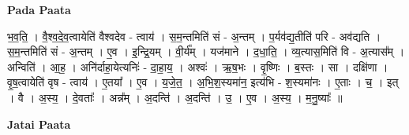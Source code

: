 \documentclass[17pt]{extarticle}
\begin{document}
\textbf{Pada Paata} \newline

भ॒व॒ति॒ । वै॒श्व॒दे॒व॒त्वायेति॑ वैश्वदेव - त्वाय॑ । स॒म॒न्तमिति॑ सं - अ॒न्तम् । प॒र्यव॑द्य॒तीति॑ परि - अव॑द्यति । स॒म॒न्तमिति॑ सं - अ॒न्तम् । ए॒व ।  इ॒न्द्रि॒यम् । वी॒र्य᳚म् । यज॑माने । द॒धा॒ति॒ । व्य॒त्यास॒मिति॑ वि - अ॒त्यास᳚म् । अन्विति॑ । आ॒ह॒ । अनि॑र्दाहा॒येत्यनिः॑ - दा॒हा॒य॒ । अश्वः॑ ।   ऋ॒ष॒भः । वृ॒ष्णिः । ब॒स्तः । सा । दक्षि॑णा । वृ॒ष॒त्वायेति॑ वृष - त्वाय॑ । ए॒तया᳚ । ए॒व । य॒जे॒त॒ । अ॒भि॒श॒स्यमा॑न॒ इत्य॑भि - श॒स्यमा॑नः । ए॒ताः । च॒ । इत् । वै । अ॒स्य॒ । दे॒वताः᳚ । अन्न᳚म् । अ॒दन्ति॑ । अ॒दन्ति॑ । उ॒ । ए॒व । अ॒स्य॒ । म॒नु॒ष्याः᳚ ॥  \newline



\textbf{Jatai Paata} \newline
\end{document}
